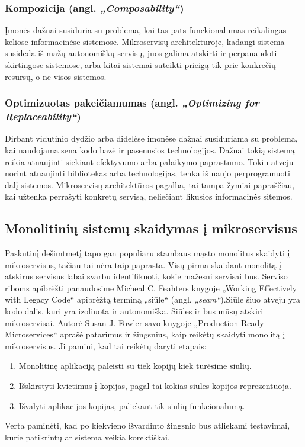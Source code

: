 \subsubsection{Kompozicija (angl. \textit{„Composability“})}
Įmonės dažnai susiduria su problema, kai tas pats funckionalumas reikalingas keliose informacinėse sistemose.
Mikroservisų architektūroje, kadangi sistema susideda iš mažų autonomiškų servisų, juos galima atskirti ir perpanaudoti
skirtingose sistemose, arba kitai sistemai suteikti prieigą tik prie konkrečių resursų, o ne visos sistemos.
\subsubsection{Optimizuotas pakeičiamumas (angl. \textit{„Optimizing for Replaceability“})}
Dirbant vidutinio dydžio arba didelėse imonėse dažnai susiduriama su problema, kai naudojama sena kodo bazė ir pasenusios technologijos.
Dažnai tokią sistemą reikia atnaujinti siekiant efektyvumo arba palaikymo paprastumo. Tokiu atveju norint
atnaujinti bibliotekas arba technologijas, tenka iš naujo perprogramuoti dalį sistemos. Mikroservisų architektūros pagalba,
tai tampa žymiai papraščiau, kai užtenka perrašyti konkretų servisą, neliečiant likusios informacinės sitemos.
\subsection{Monolitinių sistemų skaidymas į mikroservisus}
Paskutinį dešimtmetį tapo gan populiaru stambaus mąsto monolitus skaidyti į mikroservisus, tačiau tai nėra taip paprasta.
Visų pirma skaidant monolitą į atskirus servisus labai svarbu identifikuoti, kokie mažesni servisai bus.
Serviso riboms apibrėžti panaudosime Micheal C. Feahters knygoje „Working Effectively with Legacy Code“ \cite{Bk5} apibrėžtą terminą
„siūle“ (angl. \textit{„seam“}).Siūle šiuo atveju yra kodo dalis, kuri yra izoliuota ir autonomiška.
Siūles ir bus mūsų atskiri mikroservisai.
Autorė Susan J. Fowler savo knygoje „Production-Ready Microservices“ \cite{Bk1} aprašė patarimus ir žingsnius,
kaip reikėtų skaidyti monolitą į mikroservisus. Ji pamini, kad tai reikėtų daryti etapais:
\begin{enumerate}
	\item Monolitinę aplikaciją paleisti su tiek kopijų kiek turėsime siūlių.
	\item Išskirstyti kvietimus į kopijas, pagal tai kokias siūles kopijos reprezentuoja.
	\item Išvalyti aplikacijos kopijas, paliekant tik siūlių funkcionalumą.
\end{enumerate}
Verta paminėti, kad po kiekvieno išvardinto žingsnio bus atliekami testavimai, kurie patikrintų
ar sistema veikia korektiškai.

